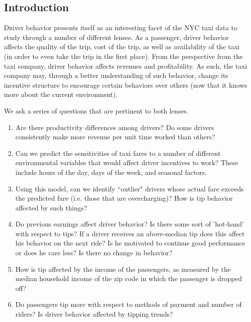 \documentclass[twoside]{article}
\begin{document}
\begin{multicols}{2} %

\section{Introduction}

\lettrine[nindent=0em,lines=3]{D} river behavior presents itself as an interesting facet of the NYC taxi data to study through a number of different lenses. As a passenger, driver behavior affects the quality of the trip, cost of the trip, as well as availability of the taxi (in order to even take the trip in the first place). From the perspective from the taxi company, driver behavior affects revenues and profitability. As such, the taxi company may, through a better understanding of such behavior, change its incentive structure to encourage certain behaviors over others (now that it knows more about the current environment). 

We ask a series of questions that are pertinent to both lenses. 
\begin{enumerate}
\item Are there productivity differences among drivers? Do some drivers consistently make more revenue per unit time worked than others? 
\item Can we predict the sensitivities of taxi fares to a number of different environmental variables that would affect driver incentives to work? These include hours of the day, days of the week, and seasonal factors.
\item Using this model, can we identify ``outlier" drivers whose actual fare exceeds the predicted fare (i.e. those that are overcharging)? How is tip behavior affected by such things?
\item Do previous earnings affect driver behavior? Is there some sort of 'hot-hand' with respect to tips? If a driver receives an above-median tip does this affect his behavior on the next ride? Is he motivated to continue good performance or does he care less? Is there no change in behavior?
\item How is tip affected by the income of the passengers, as measured by the median household income of the zip code in which the passenger is dropped off?
\item Do passengers tip more with respect to methods of payment and number of riders? Is driver behavior affected by tipping trends?
\end{enumerate}


\end{multicols}
\end{document}

